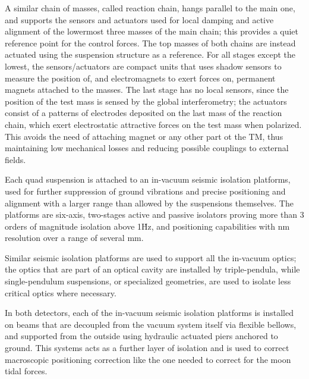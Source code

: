 A similar chain of masses, called reaction chain, hangs parallel to the main one, and supports the sensors and actuators used for local damping and active alignment of the lowermost three masses of the main chain; this provides a quiet reference point for the control forces. The top masses of both chains are instead actuated using the suspension structure as a reference. For all stages except the lowest, the sensors/actuators are compact units that uses shadow sensors to measure the position of, and electromagnets to exert forces on, permanent magnets attached to the masses. The last stage has no local sensors, since the position of the test mass is sensed by the global interferometry; the actuators consist of a patterns of electrodes deposited on the last mass of the reaction chain, which exert electrostatic attractive forces on the test mass when polarized. This avoids the need of attaching magnet or any other part ot the TM, thus maintaining low mechanical losses and reducing possible couplings to external fields.

Each quad suspension is attached to an in-vacuum seismic isolation platforms, used for further suppression of ground vibrations and precise positioning and alignment with a larger range than allowed by the suspensions themselves. The platforms are six-axis, two-stages active and passive isolators proving more than 3 orders of magnitude isolation above 1\.Hz, and positioning capabilities with nm resolution over a range of several mm.

Similar seismic isolation platforms are used to support all the in-vacuum optics; the optics that are part of an optical cavity are installed by triple-pendula, while single-pendulum suspensions, or specialized geometries, are used to isolate less critical optics where necessary.

In both detectors, each of the in-vacuum seismic isolation platforms is installed on beams that are decoupled from the vacuum system itself via flexible bellows, and supported from the outside using hydraulic actuated piers anchored to ground. This systems acts as a further layer of isolation and is used to correct macroscopic positioning correction like the one needed to correct for the moon tidal forces.


